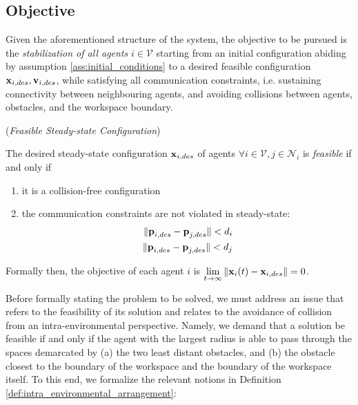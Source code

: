 \subsection{Objective}

Given the aforementioned structure of the system, the objective to be
pursued is the \textit{stabilization of all agents} $i \in \mathcal{V}$ starting
from an initial configuration abiding by assumption
\eqref{ass:initial_conditions} to a desired feasible configuration
$\bm{\mathbf{x}}_{i,des}, \bm{\mathbf{v}}_{i,des}$, while
satisfying all communication constraints, i.e. sustaining connectivity between
neighbouring agents, and avoiding collisions between agents, obstacles, and the
workspace boundary.

\begin{bw_box}
\begin{definition} (\textit{Feasible Steady-state Configuration})

The desired steady-state configuration $\bm{\mathbf{x}}_{i,des}$ of agents
$\forall i \in \mathcal{V}, j \in \mathcal{N}_i$ is \textit{feasible} if and
only if

\begin{enumerate}
  \item it is a collision-free configuration
  \item the communication constraints are not violated in steady-state:
    \begin{align}
      \|\bm{\mathbf{p}}_{i,des} - \bm{\mathbf{p}}_{j,des}\| < d_i \\
      \|\bm{\mathbf{p}}_{i,des} - \bm{\mathbf{p}}_{j,des}\| < d_j \\
    \end{align}
\end{enumerate}

\end{definition}
\end{bw_box}

Formally then, the objective of each agent $i$ is
$\lim\limits_{t \to \infty} \|\bm{\mathbf{x}}_i(t) - \bm{\mathbf{x}}_{i,des}\| = 0$.

Before formally stating the problem to be solved, we must address an issue
that refers to the feasibility of its solution and relates to the avoidance of
collision from an intra-environmental perspective. Namely, we demand that a
solution be feasible if and only if the agent with the largest radius is able to
pass through the spaces demarcated by (a) the two least distant obstacles,
and (b) the obstacle closest to the boundary of the workspace and the
boundary of the workspace itself. To this end, we formalize the relevant notions
in Definition \eqref{def:intra_environmental_arrangement}:

